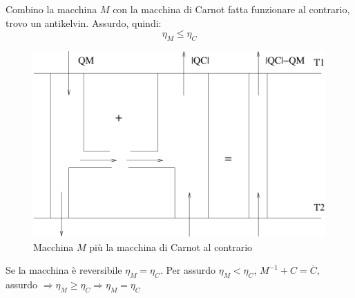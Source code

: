 Combino la macchina $M$ con la macchina di Carnot fatta funzionare al contrario, trovo un antikelvin. Assurdo, quindi: \begin{equation*}\eta_M\leq\eta_C\end{equation*}
\begin{figure}[htbp]
\centering
\includegraphics[scale=0.5]{immagini/fisica1/M+c-1}
\caption{Macchina $M$ più la macchina di Carnot al contrario}
\end{figure}

\begin{Cor}
Se la macchina è reversibile $\eta_M=\eta_C$. Per assurdo $\eta_M<\eta_C$, $M^{-1}+C=\overline{C},$ assurdo $\Rightarrow \eta_M\geq\eta_C\Rightarrow \eta_M=\eta_C$
\end{Cor}

